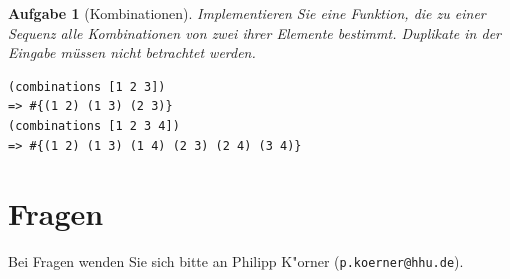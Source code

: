 \documentclass[11pt,a4paper]{article}
\newcounter{numb}
\theoremstyle{break}
\newtheorem{aufgabe}{Aufgabe}[numb]
\begin{document}
\begin{aufgabe}[Kombinationen]

Implementieren Sie eine Funktion, die zu einer Sequenz alle Kombinationen von zwei ihrer Elemente bestimmt. Duplikate in der Eingabe m\"ussen nicht betrachtet werden.

\begin{verbatim}
(combinations [1 2 3])
=> #{(1 2) (1 3) (2 3)}
(combinations [1 2 3 4])
=> #{(1 2) (1 3) (1 4) (2 3) (2 4) (3 4)}

\end{verbatim}
\end{aufgabe}

\section*{Fragen}
Bei Fragen wenden Sie sich bitte an Philipp K"orner (\texttt{p.koerner@hhu.de}).
\end{document}
